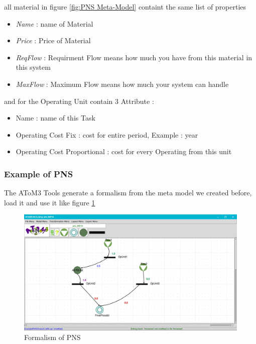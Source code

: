 all material in figure \ref{fig:PNS Meta-Model} containt the same list of properties
\begin{itemize}

\newcommand{\localtextbulletone}{\textcolor{gray}{\raisebox{.45ex}{\rule{.6ex}{.6ex}}}}
\renewcommand{\labelitemi}{\localtextbulletone}

\item \textit{Name} : name of Material 
\item \textit{Price} : Price of Material
\item \textit{ReqFlow} : Requirment Flow means how much you have from this material in this system
\item \textit{MaxFlow} : Maximum Flow means how much your system can handle

\end{itemize}



and for the Operating Unit contain 3 Attribute : 
\begin{itemize}
\newcommand{\localtextbulletone}{\textcolor{gray}{\raisebox{.45ex}{\rule{.6ex}{.6ex}}}}
\renewcommand{\labelitemi}{\localtextbulletone}
\item Name : name of this Task 
\item Operating Cost Fix  : cost for entire period, Example : year
\item Operating Cost Proportional  :  cost for every Operating from this unit

\end{itemize}


\subsubsection{Example of PNS}
The AToM3 Tools  generate a formalism from the meta model we created before, load it and use it like figure \ref{fig:PNS Model} 

\begin{figure}[th]
	\centering
 	\includegraphics[scale=0.3]{ch3/img/pns_model}
	\caption{\label{fig:PNS Model}Formalism of PNS}
\end{figure} 

